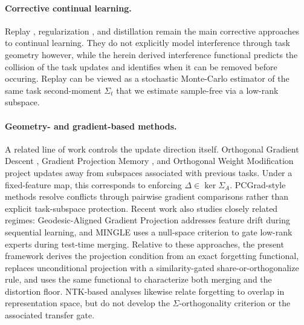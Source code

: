 \documentclass[10pt,a4paper]{article}
\theoremstyle{plain}
\theoremstyle{definition}
\newcommand{\Sig}{\Sigma}
\newcommand{\Del}{\Delta}
\begin{document}
\paragraph{Corrective continual learning.} Replay \cite{lopezpaz2017,chaudhry2019,buzzega2020}, regularization \cite{kirkpatrick2017,zenke2017}, and distillation \cite{li2017lwf}
remain the main corrective approaches to continual learning.
They do not explicitly model interference through
task geometry however, while the herein derived interference functional predicts the
collision of the task updates and identifies when it can be removed before occuring. Replay can be
viewed as a stochastic Monte-Carlo estimator of the same task second-moment $\Sig_t$
that we estimate sample-free via a low-rank subspace.

\paragraph{Geometry- and gradient-based methods.} A related line of work controls the
update direction itself. Orthogonal Gradient Descent \cite{farajtabar2020}, Gradient
Projection Memory \cite{saha2021}, and Orthogonal Weight Modification
\cite{zeng2019owm} project updates away from subspaces associated with previous
tasks. Under a fixed-feature map, this corresponds to enforcing $\Del\in\ker\Sig_A$.
PCGrad-style methods \cite{yu2020pcgrad} resolve conflicts through pairwise gradient
comparisons rather than explicit task-subspace protection. Recent work also studies
closely related regimes: Geodesic-Aligned Gradient Projection \cite{geodesic2025}
addresses feature drift during sequential learning, and MINGLE \cite{mingle2025} uses
a null-space criterion to gate low-rank experts during test-time merging. Relative to
these approaches, the present framework derives the projection condition from an exact
forgetting functional, replaces unconditional projection with a similarity-gated
share-or-orthogonalize rule, and uses the same functional to characterize both
merging and the distortion floor. NTK-based analyses \cite{doan2021,bennani2020}
likewise relate forgetting to overlap in representation space, but do not develop the
$\Sig$-orthogonality criterion or the associated transfer gate.
\end{document}
